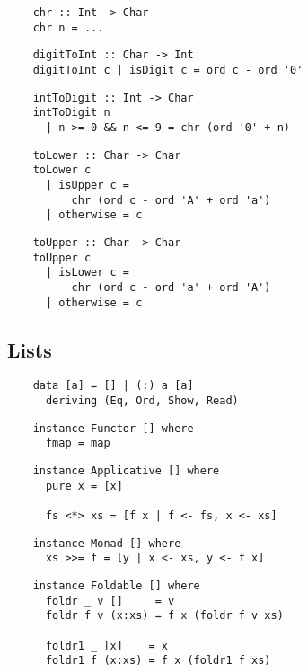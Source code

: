 \begin{multicols}{2}
	\begin{verbatim}
	chr :: Int -> Char 
	chr n = ...
	\end{verbatim}
	
	\begin{verbatim}
	digitToInt :: Char -> Int 
	digitToInt c | isDigit c = ord c - ord '0'
	\end{verbatim}
	
	\begin{verbatim}
	intToDigit :: Int -> Char 
	intToDigit n 
	  | n >= 0 && n <= 9 = chr (ord '0' + n)
	\end{verbatim}
	
	\begin{verbatim}
	toLower :: Char -> Char 
	toLower c 
	  | isUpper c =
	      chr (ord c - ord 'A' + ord 'a')
	  | otherwise = c
	\end{verbatim}
	
	\begin{verbatim}
	toUpper :: Char -> Char 
	toUpper c 
	  | isLower c =
	      chr (ord c - ord 'a' + ord 'A')
	  | otherwise = c
	\end{verbatim}
	
	\subsection*{Lists}
	
	\begin{verbatim}
	data [a] = [] | (:) a [a]
	  deriving (Eq, Ord, Show, Read)
	\end{verbatim}
	
	\begin{verbatim}
	instance Functor [] where 
	  fmap = map
	\end{verbatim}
	
	\begin{verbatim}
	instance Applicative [] where
	  pure x = [x]
	  
	  fs <*> xs = [f x | f <- fs, x <- xs]
	\end{verbatim}
	
	\begin{verbatim}
	instance Monad [] where 
	  xs >>= f = [y | x <- xs, y <- f x]
	\end{verbatim}
	
	\begin{verbatim}
	instance Foldable [] where 
	  foldr _ v []     = v 
	  foldr f v (x:xs) = f x (foldr f v xs)
	  
	  foldr1 _ [x]    = x 
	  foldr1 f (x:xs) = f x (foldr1 f xs)
	  

\end{verbatim}
\end{multicols}
